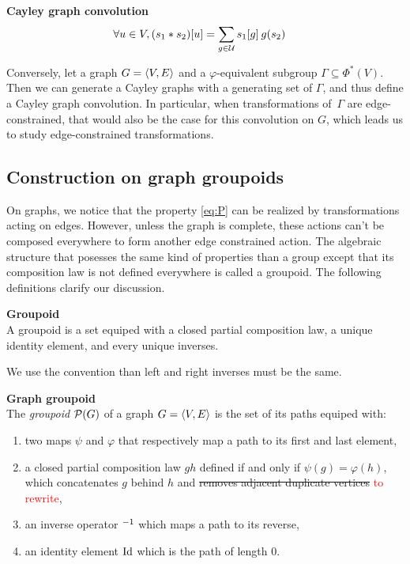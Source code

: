 \begin{definition}\textbf{Cayley graph convolution}\\
\begin{align*}
\forall u \in V, (s_1 \ast s_2) [u] & = \displaystyle \sum_{g \in \cu} s_1[g] \h{2} g(s_2)
\end{align*}
\end{definition}

Conversely, let a graph $\gve$ and a $\varphi$-equivalent subgroup $\Gamma \subseteq \Phi^{*}(V)$. Then we can generate a Cayley graphs with a generating set of $\Gamma$, and thus define a Cayley graph convolution. In particular, when transformations of~$\Gamma$ are edge-constrained, that would also be the case for this convolution on $G$, which leads us to study edge-constrained transformations.


\subsection{Construction on graph groupoids}


On graphs, we notice that the property \eqref{eq:P} can be realized by transformations acting on edges. However, unless the graph is complete, these actions can't be composed everywhere to form another edge constrained action. The algebraic structure that posesses the same kind of properties than a group except that its composition law is not defined everywhere is called a groupoid. The following definitions clarify our discussion.

\begin{definition}\textbf{Groupoid}\\
A groupoid is a set equiped with a closed partial composition law, a unique identity element, and every unique inverses.
\end{definition}

\begin{remark}We use the convention than left and right inverses must be the same.
\end{remark}

\begin{definition}\textbf{Graph groupoid}\\
The \emph{groupoid} $\cp(G)$ of a graph $\gve$ is the set of its paths equiped with:
\begin{enumerate}
\item two maps $\psi$ and $\varphi$ that respectively map a path to its first and last element,
\item a closed partial composition law $gh$ defined if and only if $\psi(g) = \varphi(h)$, which concatenates $g$ behind $h$ and \sout{removes adjacent duplicate vertices} \textcolor{red}{to rewrite},
\item an inverse operator $\h{0}^{-1}$ which maps a path to its reverse,
\item an identity element $\id$ which is the path of length $0$.
\end{enumerate}
\end{definition}

